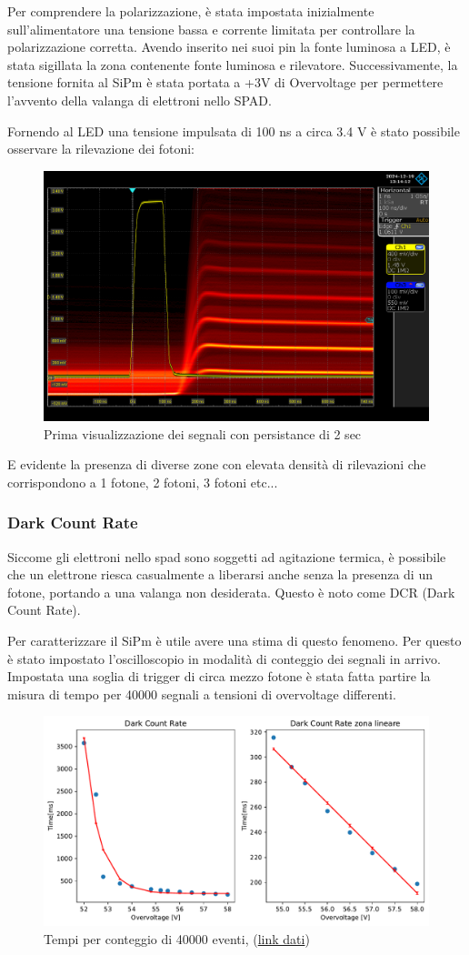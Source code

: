 Per comprendere la polarizzazione, è stata impostata inizialmente sull'alimentatore una tensione bassa e corrente limitata per controllare la polarizzazione corretta. Avendo inserito nei suoi pin la fonte luminosa a LED, è stata sigillata la zona contenente fonte luminosa e rilevatore. Successivamente, la tensione fornita al SiPm è stata portata a +3V di Overvoltage per permettere l'avvento della valanga di elettroni nello SPAD.

Fornendo al LED una tensione impulsata di 100 ns a circa 3.4 V è stato possibile osservare la rilevazione dei fotoni:

\begin{figure}[!h]
    \centering
    \includegraphics[width=0.5\linewidth]{Photomultiplier/assets/SiPm/SiPm.png}
    \caption{Prima visualizzazione dei segnali con persistance di 2 sec}
\end{figure}

E evidente la presenza di diverse zone con elevata densità di rilevazioni
che corrispondono a 1 fotone, 2 fotoni, 3 fotoni etc...

\subsubsection{Dark Count Rate}
Siccome gli elettroni nello spad sono soggetti ad agitazione termica, è possibile che un elettrone riesca casualmente a liberarsi anche senza la presenza di un fotone, portando a una valanga non desiderata. Questo è noto come DCR (Dark Count Rate).

Per caratterizzare il SiPm è utile avere una stima di questo fenomeno. Per questo è stato impostato l'oscilloscopio in modalità di conteggio dei segnali in arrivo. Impostata una soglia di trigger di circa mezzo fotone è stata fatta partire la misura di tempo per 40000 segnali a tensioni di overvoltage differenti.

\begin{figure}[!h]
    \centering
    \includegraphics[width=0.6\linewidth]{Photomultiplier/assets/SiPm/SiPm_DCR.pdf}
    \caption{Tempi per conteggio di 40000 eventi, (\href{https://github.com/Yedi278/Esperimentazioni-Elettronica/tree/main/SiPm/Caratterizzazione\%20Hamamatsu}{link dati})}
\end{figure}

